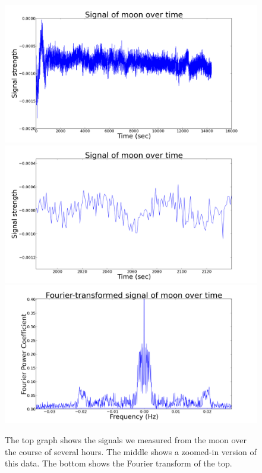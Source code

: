 \documentclass[11pt]{article}
\begin{document}
\begin{figure}
\centering
\includegraphics[scale=0.35]{garphs/moonvolt}
\includegraphics[scale=0.35]{garphs/moonzoom}
\includegraphics[scale=0.35]{garphs/moonfourier}
\caption{The top graph shows the signals we measured from the moon over the course of several hours. The middle shows a zoomed-in version of this data. The bottom shows the Fourier transform of the top. \label{moon}}
\end{figure}
\end{document}
